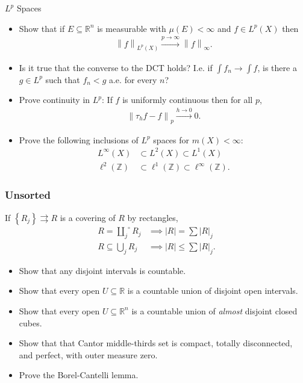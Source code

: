 \(L^p\) Spaces

\begin{itemize}
\tightlist
\item
  Show that if \(E\subseteq {\mathbb{R}}^n\) is measurable with
  \(\mu(E) < \infty\) and \(f\in L^p(X)\) then
  \begin{align*}{\left\lVert {f} \right\rVert}_{L^p(X)} \overset{p\to\infty}\to {\left\lVert {f} \right\rVert}_\infty.\end{align*}
\item
  Is it true that the converse to the DCT holds? I.e. if
  \(\int f_n \to \int f\), is there a \(g\in L^p\) such that \(f_n < g\)
  a.e. for every \(n\)?
\item
  Prove continuity in \(L^p\): If \(f\) is uniformly continuous then for
  all \(p\),
  \begin{align*}{\left\lVert {\tau_h f - f} \right\rVert}_p \overset{h\to 0}\to 0.\end{align*}
\item
  Prove the following inclusions of \(L^p\) spaces for
  \(m(X) < \infty\):
  \begin{align*}
  L^\infty(X) &\subset L^2(X) \subset L^1(X) \\
  \ell^2({\mathbb{Z}}) &\subset \ell^1({\mathbb{Z}}) \subset \ell^\infty({\mathbb{Z}})
  .\end{align*}
\end{itemize}

\hypertarget{unsorted-1}{%
\subsubsection{Unsorted}\label{unsorted-1}}

\begin{proposition}

If \(\left\{{R_j}\right\} \rightrightarrows R\) is a covering of \(R\)
by rectangles,
\begin{align*}
R = \overset{\circ}{\displaystyle\coprod_{j}} R_j &\implies {\left\lvert {R} \right\rvert} = \sum {\left\lvert {R} \right\rvert}_j \\
R \subseteq \displaystyle\bigcup_j R_j &\implies {\left\lvert {R} \right\rvert} \leq \sum {\left\lvert {R} \right\rvert}_j
.\end{align*}

\end{proposition}

\begin{itemize}
\tightlist
\item
  Show that any disjoint intervals is countable.
\item
  Show that every open \(U \subseteq {\mathbb{R}}\) is a countable union
  of disjoint open intervals.
\item
  Show that every open \(U \subseteq {\mathbb{R}}^n\) is a countable
  union of \emph{almost} disjoint closed cubes.
\item
  Show that that Cantor middle-thirds set is compact, totally
  disconnected, and perfect, with outer measure zero.
\item
  Prove the Borel-Cantelli lemma.
\end{itemize}

